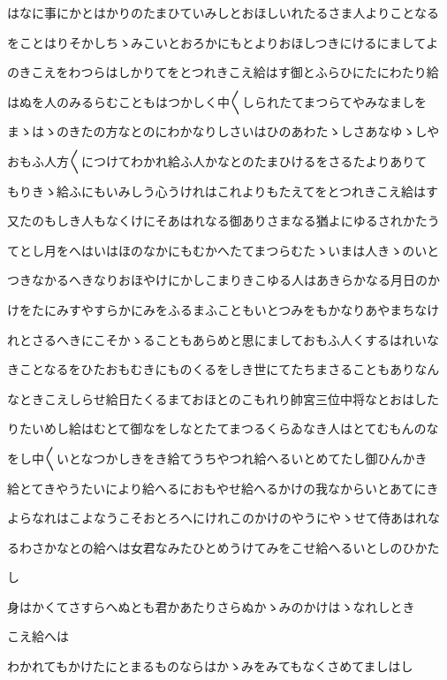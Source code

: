 \documentclass[a4paper,11pt,landscape]{ltjtarticle}
\begin{document}
はなに事にかとはかりのたまひていみしとおほしいれたるさま人よりことなる
\par\medskip
をことはりそかしちゝみこいとおろかにもとよりおほしつきにけるにましてよ
\par\medskip
のきこえをわつらはしかりてをとつれきこえ給はす御とふらひにたにわたり給
\par\medskip
はぬを人のみるらむこともはつかしく中〱しられたてまつらてやみなましを
\par\medskip
まゝはゝのきたの方なとのにわかなりしさいはひのあわたゝしさあなゆゝしや
\par\medskip
おもふ人方〱につけてわかれ給ふ人かなとのたまひけるをさるたよりありて
\par\medskip
もりきゝ給ふにもいみしう心うけれはこれよりもたえてをとつれきこえ給はす
\par\medskip
又たのもしき人もなくけにそあはれなる御ありさまなる猶よにゆるされかたう
\par\medskip
てとし月をへはいはほのなかにもむかへたてまつらむたゝいまは人きゝのいと
\par\medskip
つきなかるへきなりおほやけにかしこまりきこゆる人はあきらかなる月日のか
\par\medskip
けをたにみすやすらかにみをふるまふこともいとつみをもかなりあやまちなけ
\par\medskip
れとさるへきにこそかゝることもあらめと思にましておもふ人くするはれいな
\par\medskip
きことなるをひたおもむきにものくるをしき世にてたちまさることもありなん
\par\medskip
なときこえしらせ給日たくるまておほとのこもれり帥宮三位中将なとおはした
\par\medskip
りたいめし給はむとて御なをしなとたてまつるくらゐなき人はとてむもんのな
\par\medskip
をし中〱いとなつかしきをき給てうちやつれ給へるいとめてたし御ひんかき
\par\medskip
給とてきやうたいにより給へるにおもやせ給へるかけの我なからいとあてにき
\par\medskip
よらなれはこよなうこそおとろへにけれこのかけのやうにやゝせて侍あはれな
\par\medskip
るわさかなとの給へは女君なみたひとめうけてみをこせ給へるいとしのひかた
\par\medskip
し
\par\medskip
身はかくてさすらへぬとも君かあたりさらぬかゝみのかけはゝなれしとき
\par\medskip
こえ給へは
\par\medskip
わかれてもかけたにとまるものならはかゝみをみてもなくさめてましはし
\end{document}

